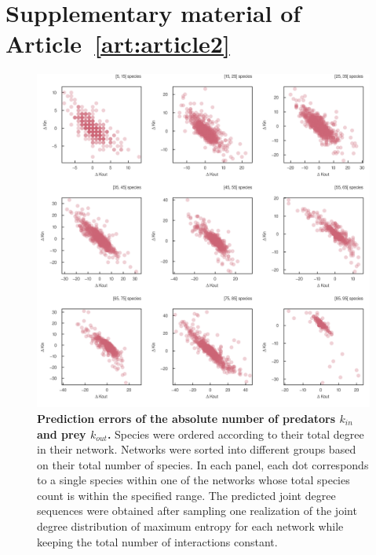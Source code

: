 
\anglais

\setcounter{figure}{0}
\renewcommand{\thefigure}{B\arabic{figure}}

\setcounter{table}{0}
\renewcommand{\thetable}{\arabic{chapter}.\arabic{table}}

\chapter{Supplementary material of Article~\ref{art:article2}}\label{supp:B}

\begin{figure}[h]
    \centering
    \includegraphics[width=\textwidth]{figures/S_article2/kin_kout_difference_strata.png}
    \caption{\textbf{Prediction errors of the absolute number of predators $k_{in}$ and prey
    $k_{out}$.} Species were ordered according to their total degree in their
    network. Networks were sorted into different groups based on their total number
    of species. In each panel, each dot corresponds to a single species within one
    of the networks whose total species count is within the specified range. The
    predicted joint degree sequences were obtained after sampling one realization of
    the joint degree distribution of maximum entropy for each network while keeping
    the total number of interactions
    constant.}
    \label{fig:kin_kout_diff_strata}
\end{figure}

